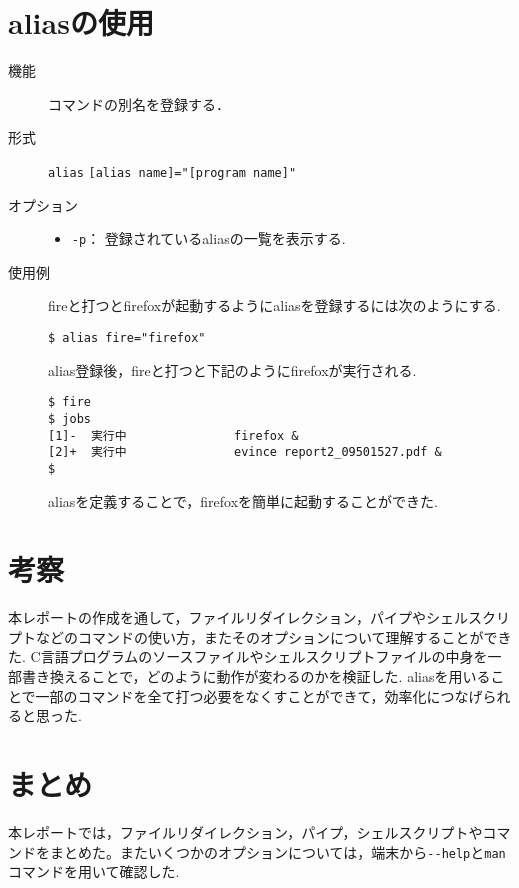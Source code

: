 \documentclass[a4j,11pt]{jarticle}
\begin{document}
\section{aliasの使用}
\begin{description}
 \item[機能]
コマンドの別名を登録する．
 \item[形式]
\verb|alias| \verb|[alias name]="[program name]"|
 \item[オプション]
\begin{itemize}
      \item \verb|-p|：  登録されているaliasの一覧を表示する.
    \end{itemize}
\item[使用例]
fireと打つとfirefoxが起動するようにaliasを登録するには次のようにする.
\begin{verbatim}
$ alias fire="firefox"
\end{verbatim}
alias登録後，fireと打つと下記のようにfirefoxが実行される.
\begin{verbatim}
$ fire
$ jobs
[1]-  実行中               firefox &
[2]+  実行中               evince report2_09501527.pdf &
$ 
\end{verbatim}
aliasを定義することで，firefoxを簡単に起動することができた.
\end{description}
\section{考察}
本レポートの作成を通して，ファイルリダイレクション，パイプやシェルスクリプトなどのコマンドの使い方，またそのオプションについて理解することができた.
C言語プログラムのソースファイルやシェルスクリプトファイルの中身を一部書き換えることで，どのように動作が変わるのかを検証した. aliasを用いることで一部のコマンドを全て打つ必要をなくすことができて，効率化につなげられると思った.


\section{まとめ}
本レポートでは，ファイルリダイレクション，パイプ，シェルスクリプトやコマンドをまとめた。またいくつかのオプションについては，端末から\verb|--help|と\verb|man|コマンドを用いて確認した.
\end{document}
